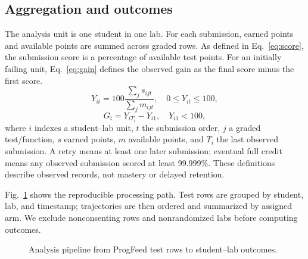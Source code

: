 \documentclass[conference]{IEEEtran}
\begin{document}
\subsection{Aggregation and outcomes}
The analysis unit is one student in one lab. For each submission, earned points and available points are summed across graded rows. As defined in Eq.~\ref{eq:score}, the submission score is a percentage of available test points. For an initially failing unit, Eq.~\ref{eq:gain} defines the observed gain as the final score minus the first score.
\begin{equation}
Y_{it}=100\frac{\sum_j s_{ijt}}{\sum_j m_{ijt}},\quad 0\leq Y_{it}\leq100,
\label{eq:score}
\end{equation}
\begin{equation}
G_i=Y_{iT_i}-Y_{i1},\quad Y_{i1}<100,
\label{eq:gain}
\end{equation}
where $i$ indexes a student--lab unit, $t$ the submission order, $j$ a graded test/function, $s$ earned points, $m$ available points, and $T_i$ the last observed submission. A retry means at least one later submission; eventual full credit means any observed submission scored at least 99.999\%. These definitions describe observed records, not mastery or delayed retention.

Fig.~\ref{fig:pipeline} shows the reproducible processing path. Test rows are grouped by student, lab, and timestamp; trajectories are then ordered and summarized by assigned arm. We exclude nonconsenting rows and nonrandomized labs before computing outcomes.
\begin{figure}[t]
\centering
{}
\caption{Analysis pipeline from ProgFeed test rows to student--lab outcomes.}
\label{fig:pipeline}
\end{figure}
\end{document}
